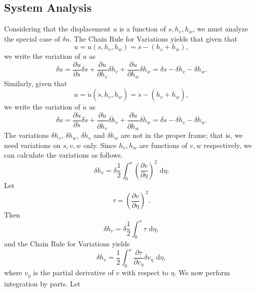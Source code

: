 \subsection{System Analysis}
Considering that the displacement $u$ is a function of $s,h_v,h_w$, we must analyze the special case of $\delta u$. The Chain Rule for Variations yields that given that
\begin{equation}
u = u(s,h_v,h_w) = s-(h_v+h_w),
\end{equation}
we write the variation of $u$ as
\begin{equation}
\delta u = \frac{\partial u}{\partial s}\delta s+\frac{\partial u}{\partial h_v}\delta h_v+\frac{\partial u}{\partial h_w}\delta h_w = \delta s - \delta h_v - \delta h_w.
\label{eq:variation.u}
\end{equation}
Similarly, given that
\begin{equation}
\dot{u} = \dot{u}(\dot s,\dot h_v, \dot h_w) = \dot s - (\dot h_v+\dot h_w),
\end{equation}
we write the variation of $\dot u$ as
\begin{equation}
\delta \dot u = \frac{\partial \dot u}{\partial \dot s}\delta \dot s+\frac{\partial \dot u}{\partial \dot h_v}\delta \dot h_v+\frac{\partial \dot u}{\partial \dot h_w}\delta \dot h_w = \delta \dot s - \delta \dot h_v - \delta \dot h_w.
\end{equation}
The variations $\delta h_v$, $\delta h_w$, $\delta \dot h_v$ and $\delta \dot h_w$ are not in the proper frame; that is, we need variations on $s,v,w$ only. Since $h_v,h_w$ are functions of $v,w$ respectively, we can calculate the variations as follows.
\begin{equation}
\delta h_v = \delta \frac{1}{2} \int_0^x\left(\frac{\partial v}{\partial \eta}\right)^2\text{ d}\eta.
\end{equation}
Let 
\begin{equation}
\tau = \left(\frac{\partial v}{\partial \eta}\right)^2.
\end{equation}
Then
\begin{equation}
\delta h_v = \delta \frac{1}{2} \int_0^x \tau \text{ d}\eta,
\end{equation}
and the Chain Rule for Variations yields
\begin{equation}
\delta h_v = \frac{1}{2}\int_0^x \frac{\partial \tau}{\partial v_{\eta}}\delta v_{\eta}\text{ d}\eta,
\end{equation}
where $v_{\eta}$ is the partial derivative of $v$ with respect to $\eta$. We now perform integration by parts. Let
